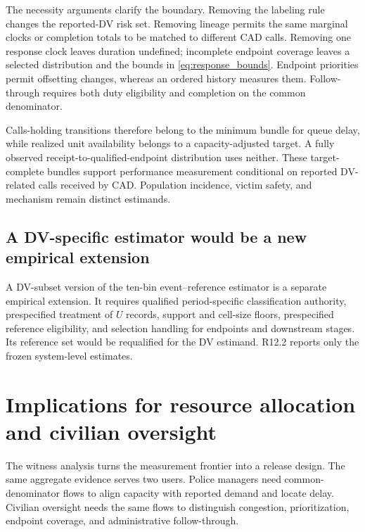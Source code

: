 \documentclass[11pt]{article}
\begin{document}
The necessity arguments clarify the boundary. Removing the labeling rule changes the reported-DV risk set. Removing lineage permits the same marginal clocks or completion totals to be matched to different CAD calls. Removing one response clock leaves duration undefined; incomplete endpoint coverage leaves a selected distribution and the bounds in \cref{eq:response_bounds}. Endpoint priorities permit offsetting changes, whereas an ordered history measures them. Follow-through requires both duty eligibility and completion on the common denominator.

Calls-holding transitions therefore belong to the minimum bundle for queue delay, while realized unit availability belongs to a capacity-adjusted target. A fully observed receipt-to-qualified-endpoint distribution uses neither. These target-complete bundles support performance measurement conditional on reported DV-related calls received by CAD. Population incidence, victim safety, and mechanism remain distinct estimands.

\subsection{A DV-specific estimator would be a new empirical extension}

A DV-subset version of the ten-bin event--reference estimator is a separate empirical extension. It requires qualified period-specific classification authority, prespecified treatment of $U$ records, support and cell-size floors, prespecified reference eligibility, and selection handling for endpoints and downstream stages. Its reference set would be requalified for the DV estimand. R12.2 reports only the frozen system-level estimates.

\section{Implications for resource allocation and civilian oversight}

The witness analysis turns the measurement frontier into a release design. The same aggregate evidence serves two users. Police managers need common-denominator flows to align capacity with reported demand and locate delay. Civilian oversight needs the same flows to distinguish congestion, prioritization, endpoint coverage, and administrative follow-through.
\end{document}
